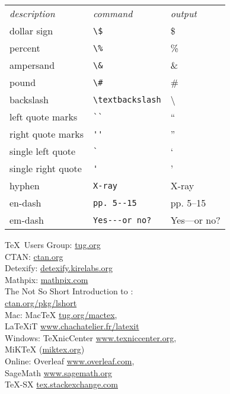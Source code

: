 \documentclass[10pt,landscape]{article}
\begin{document}
\begin{multicols}{3}
\begin{tabular}{lll}
\emph{description} & \emph{command} & \emph{output}\\
dollar sign & \verb!\$! & \$ \\
percent & \verb!\%! & \% \\
ampersand & \verb!\&! & \& \\
pound & \verb!\#! & \# \\
backslash & \verb!\textbackslash! & \textbackslash \\
left quote marks & \verb!``! & `` \\
right quote marks & \verb!''! & '' \\
single left quote  & \verb!`! & ` \\
single right quote  & \verb!'! & ' \\
hyphen & \verb!X-ray! & X-ray\\
en-dash & \verb!pp. 5--15! & pp. 5--15 \\
em-dash & \verb!Yes---or no?! & Yes---or no? 
\end{tabular}

\begin{tcolorbox}[resourcebox, title=Resources]
\small
\TeX\ Users Group: \url{tug.org}\\
CTAN: \url{ctan.org}\\
Detexify: \url{detexify.kirelabs.org}\\
Mathpix: \url{mathpix.com}\\
The Not So Short Introduction to \LaTeXe:\\ \hspace*{2em}\url{ctan.org/pkg/lshort}\\
Mac: MacTeX \url{tug.org/mactex},\\ \hspace*{2em}LaTeXiT \url{www.chachatelier.fr/latexit}\\
Windows: TeXnicCenter \url{www.texniccenter.org},\\ \hspace*{2em}MiKTeX (\url{miktex.org})\\
Online: Overleaf \url{www.overleaf.com},\\ \hspace*{2em}SageMath \url{www.sagemath.org}\\ \hspace*{2em}TeX-SX \url{tex.stackexchange.com}
\end{tcolorbox}
\end{multicols}
\end{document}
